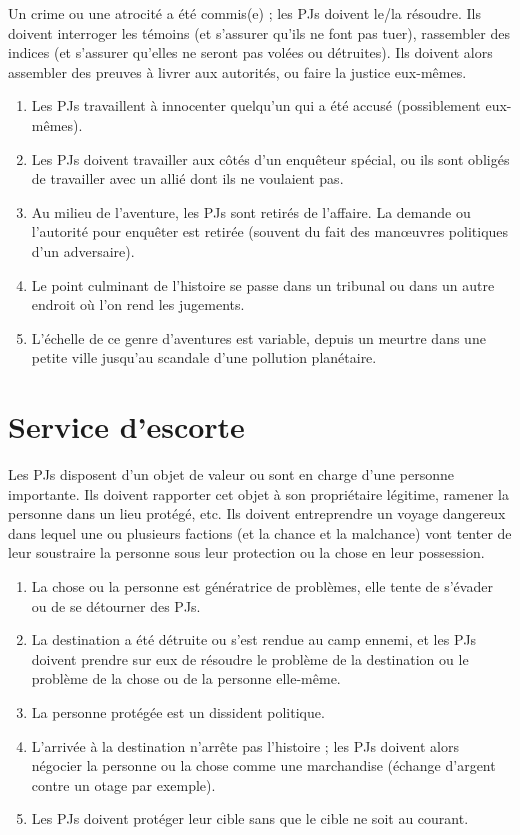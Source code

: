 \begin{multicols}{2}

Un crime ou une atrocité a été commis(e) ; les PJs doivent le/la résoudre. Ils doivent interroger les témoins (et s'assurer qu'ils ne font pas tuer), rassembler des indices (et s'assurer qu'elles ne seront pas volées ou détruites). Ils doivent alors assembler des preuves à livrer aux autorités, ou faire la justice eux-mêmes.

\themes
\begin{enumerate}
\item Les PJs travaillent à innocenter quelqu'un qui a été accusé (possiblement eux-mêmes).
\item Les PJs doivent travailler aux côtés d'un enquêteur spécial, ou ils sont obligés de travailler avec un allié dont ils ne voulaient pas.
\item Au milieu de l'aventure, les PJs sont retirés de l'affaire. La demande ou l'autorité pour enquêter est retirée (souvent du fait des manœuvres politiques d'un adversaire).
\item Le point culminant de l'histoire se passe dans un tribunal ou dans un autre endroit où l'on rend les jugements.
\item L'échelle de ce genre d'aventures est variable, depuis un meurtre dans une petite ville jusqu'au scandale d'une pollution planétaire.
\end{enumerate}

\section{Service d'escorte}
\hypertarget{escorte}{}


Les PJs disposent d'un objet de valeur ou sont en charge d'une personne importante. Ils doivent rapporter cet objet à son propriétaire légitime, ramener la personne dans un lieu protégé, etc. Ils doivent entreprendre un voyage dangereux dans lequel une ou plusieurs factions (et la chance et la malchance) vont tenter de leur soustraire la personne sous leur protection ou la chose en leur possession.

\themes
\begin{enumerate}
\item La chose ou la personne est génératrice de problèmes, elle tente de s'évader ou de se détourner des PJs.
\item La destination a été détruite ou s'est rendue au camp ennemi, et les PJs doivent prendre sur eux de résoudre le problème de la destination ou le problème de la chose ou de la personne elle-même.
\item La personne protégée est un dissident politique.
\item L'arrivée à la destination n'arrête pas l'histoire ; les PJs doivent alors négocier la personne ou la chose comme une marchandise (échange d'argent contre un otage par exemple).
\item Les PJs doivent protéger leur cible sans que le cible ne soit au courant.
\end{enumerate}


\end{multicols}
